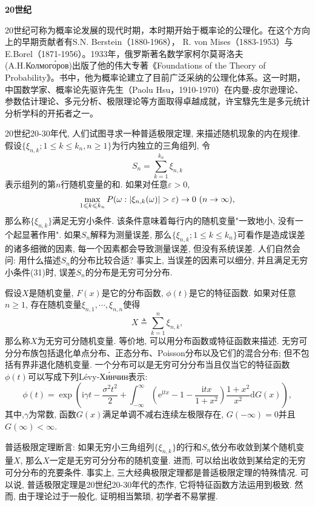 \textbf{20世纪}

20世纪可称为概率论发展的现代时期，本时期开始于概率论的公理化。在这个方向上的早期贡献者有S.N. Berstein（1880-1968）， R. von Mises（1883-1953）与E.Borel（1871-1956）。1933年，俄罗斯著名数学家柯尔莫哥洛夫(A.H.Колмого́ров)出版了他的伟大专著《Foundations of the Theory of Probability》。书中，他为概率论建立了目前广泛采纳的公理化体系。这一时期，中国数学家、概率论先驱许先生（Paolu Hsu，1910-1970）在内曼-皮尔逊理论、参数估计理论、多元分析、极限理论等方面取得卓越成就，许宝騄先生是多元统计分析学科的开拓者之一。

20世纪20-30年代, 人们试图寻求一种普适极限定理, 来描述随机现象的内在规律. 假设$\{\xi_{n,k};1\leqslant k\leqslant k_n,n\geqslant 1 \}$为行内独立的三角组列, 令
\begin{equation}
S_n = \sum_{k=1}^{k_n}\xi_{n,k}
\end{equation}
表示组列的第$n$行随机变量的和. 如果对任意$\varepsilon>0$,
\begin{equation}
\max_{1\leqslant k\leqslant k_n}P(\omega:\lvert\xi_{n,k}(\omega)\rvert>\varepsilon)\to 0~(n\to\infty),
\end{equation}
那么称$\{\xi_{n,k}\}$满足无穷小条件. 该条件意味着每行内的随机变量"一致地小, 没有一个起显著作用". 如果$S_n$解释为测量误差, 那么$\{\xi_{n,k};1\leqslant k\leqslant k_n\}$可看作是造成误差的诸多细微的因素, 每一个因素都会导致测量误差, 但没有系统误差. 人们自然会问: 用什么描述$S_n$的分布比较合适? 事实上, 当误差的因素可以细分, 并且满足无穷小条件(31)时, 误差$S_n$的分布是无穷可分分布.

假设$X$是随机变量, $F(x)$是它的分布函数, $\phi(t)$是它的特征函数. 如果对任意$n\geqslant 1$, 存在随机变量$\xi_{n,1},\cdots,\xi_{n,n}$使得
\begin{equation}
X\triangleq \sum_{k = 1}^{n}\xi_{n,k},
\end{equation}
那么称$X$为无穷可分随机变量. 等价地, 可以用分布函数或特征函数来描述. 无穷可分分布族包括退化单点分布、正态分布、Poisson分布以及它们的混合分布; 但不包括有界非退化随机变量. 一个分布可以是无穷可分分布当且仅当它的特征函数$\phi(t)$可以写成下列Lévy-Хи́нчин表示:
\begin{equation}
\phi(t)= \exp\left(\mathrm{i}\gamma t-\frac{\sigma^2t^2}{2}+\int_{-\infty}^{\infty}\left(\mathrm{e}^{\mathrm{i}tx}-1-\frac{\mathrm{i}tx}{1+x^2}\right)\frac{1+x^2}{x^2}\mathrm{d}G(x) \right),
\end{equation}
其中,$\gamma$为常数, 函数$G(x)$满足单调不减右连续左极限存在, $G(-\infty) = 0$并且$G(\infty)<\infty$.

普适极限定理断言: 如果无穷小三角组列$\{\xi_{n,k}\}$的行和$S_n$依分布收敛到某个随机变量$X$, 那么$X$一定是无穷可分分布的随机变量. 进而, 可以给出收敛到某给定的无穷可分分布的充要条件. 事实上, 三大经典极限定理都是普适极限定理的特殊情况. 可以说, 普适极限定理是20世纪20-30年代的杰作, 它将特征函数方法运用到极致. 然而, 由于理论过于一般化, 证明相当繁琐, 初学者不易掌握.

